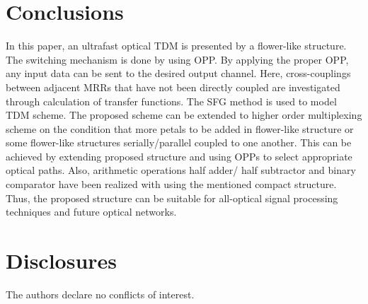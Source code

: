 \documentclass{osa-article}
\begin{document}
\section{Conclusions}
\label{}
In this paper, an ultrafast optical TDM is presented by a flower-like structure. The switching mechanism is done by using OPP. By applying the proper OPP, any input data can be sent to the desired output channel. Here, cross-couplings between adjacent MRRs that have not been directly coupled are investigated through calculation of transfer functions. The SFG method is used to model TDM scheme. The proposed scheme can be extended to higher order multiplexing scheme on the condition that more petals to be added in flower-like structure or some flower-like structures serially/parallel coupled to one another. This can be achieved by extending proposed structure and using OPPs to select appropriate optical paths. Also, arithmetic operations half adder/ half subtractor and binary comparator have been realized with using the mentioned compact structure. Thus, the proposed structure can be suitable for all-optical signal processing techniques and future optical networks.
\section*{Disclosures}
The authors declare no conflicts of interest.

\appendix
\end{document}

